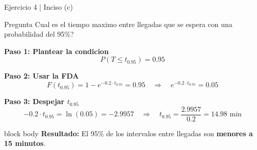 \documentclass[10pt]{beamer}
\begin{document}
\begin{frame}{Ejercicio 4 | Inciso (c)}
\begin{exampleblock}{Pregunta}
Cual es el tiempo maximo entre llegadas que se espera con una probabilidad del 95\%?
\end{exampleblock}

\vspace{0.2cm}
\textbf{Paso 1: Plantear la condicion}
\[
P(T \leq t_{0.95}) = 0.95
\]

\vspace{0.1cm}
\textbf{Paso 2: Usar la FDA}
\[
F(t_{0.95}) = 1 - e^{-0.2 \cdot t_{0.95}} = 0.95 \quad \Rightarrow \quad e^{-0.2 \cdot t_{0.95}} = 0.05
\]

\vspace{0.1cm}
\textbf{Paso 3: Despejar $t_{0.95}$}
\[
-0.2 \cdot t_{0.95} = \ln(0.05) = -2.9957 \quad \Rightarrow \quad t_{0.95} = \frac{2.9957}{0.2} = \boxed{14.98 \text{ min}}
\]

\vspace{0.2cm}
\begin{beamercolorbox}[rounded=true,shadow=true,wd=\linewidth]{block body}
\centering
\textbf{Resultado:} El 95\% de los intervalos entre llegadas son \textbf{menores a 15 minutos}.
\end{beamercolorbox}
\end{frame}
\end{document}
